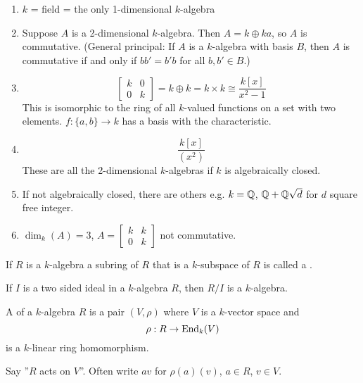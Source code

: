   \begin{enumerate}
    \item $k$ = field = the only 1-dimensional $k$-algebra
    \item Suppose $A$ is a 2-dimensional $k$-algebra. Then $A = k\oplus ka$,
      so $A$ is commutative. (General principal: If $A$ is a $k$-algebra with
      basis $B$, then $A$ is commutative if and only if $bb' = b'b$ for all
      $b,b' \in B$.)
    \item \[\begin{bmatrix} k & 0 \\ 0 & k \end{bmatrix} = k\oplus k
      = k\times k \cong \frac{k[x]}{x^2-1}\]
      This is isomorphic to the ring of all $k$-valued functions on a set with
      two elements. $f:\{a,b\} \to k$ has a basis with the characteristic.
    \item \[\frac{k[x]}{(x^2)}\]
      These are all the 2-dimensional $k$-algebras if $k$ is algebraically
      closed.
    \item If not algebraically closed, there are others e.g. $k = \mathbb{Q}$,
      $\mathbb{Q} + \mathbb{Q}\sqrt{d}$ for $d$ square free integer.
    \item $\dim_k(A) = 3$, $A = \begin{bmatrix} k & k \\ 0 & k\end{bmatrix}$
      not commutative.
  \end{enumerate}

  \begin{define}
    If $R$ is a $k$-algebra a subring of $R$ that is a $k$-subspace of $R$ is
    called a .
  \end{define}
  
  If $I$ is a two sided ideal in a $k$-algebra $R$, then $R/I$ is a $k$-algebra.

  \begin{define}
    A  of a $k$-algebra $R$ is a pair $(V,\rho)$ where $V$
    is a $k$-vector space and
    \[ \rho: R \to \operatorname{End}_k(V) \]
    is a $k$-linear ring homomorphism.
  \end{define}
  Say ''$R$ acts on $V$''. Often write $av$ for $\rho(a)(v)$, $a\in R$, $v\in V$.
